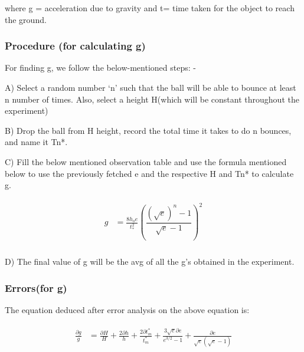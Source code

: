 \documentclass[11pt]{scrartcl} %
\begin{document}
where g = acceleration due to gravity and t= time taken for the object to reach the ground. \par

\subsubsection{Procedure (for calculating g)}
For finding g, we follow the below-mentioned steps: - \par

A) Select a random number ‘n’ such that the ball will be able to bounce at least n number of times. Also, select a height H(which will be constant throughout the experiment)\par

B) Drop the ball from H height, record the total time it takes to do n bounces, and name it Tn*. \par

C) Fill the below mentioned observation table and use the formula mentioned below to use the previously fetched e and the respective H and Tn* to calculate g. \par
\begin{align} 
	\begin{split}
		g &= \frac{8h_{o}e}{t_{*}^{2}}\left(\dfrac{(\sqrt{e})^n-1}{\sqrt{e}-1}\right)^2\\
	\end{split}					
\end{align}
	 
D) The final value of g will be the avg of all the g’s obtained in the experiment. \par

\subsubsection{Errors(for g)}
The equation deduced after error analysis on the above equation is:\par

\begin{align} 
	\begin{split}
		\frac{\partial{g}}{g} &= \frac{\partial{H}}{H} + \frac{2\partial{h}}{h}+\frac{2\partial{t_m^*}}{t_m^*}+\frac{3\sqrt{e}\partial{e}}{e^{3/2}-1}+\frac{\partial{e}}{\sqrt{e}(\sqrt{e}-1)}\\
	\end{split}					
\end{align}
\end{document}
